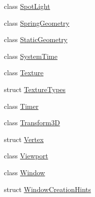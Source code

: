 \begin{DoxyCompactItemize}
\item 
class \mbox{\hyperlink{classec_1_1_spot_light}{Spot\+Light}}
\item 
class \mbox{\hyperlink{classec_1_1_spring_geometry}{Spring\+Geometry}}
\item 
class \mbox{\hyperlink{classec_1_1_static_geometry}{Static\+Geometry}}
\item 
class \mbox{\hyperlink{classec_1_1_system_time}{System\+Time}}
\item 
class \mbox{\hyperlink{classec_1_1_texture}{Texture}}
\item 
struct \mbox{\hyperlink{structec_1_1_texture_types}{Texture\+Types}}
\item 
class \mbox{\hyperlink{classec_1_1_timer}{Timer}}
\item 
class \mbox{\hyperlink{classec_1_1_transform3_d}{Transform3D}}
\item 
struct \mbox{\hyperlink{structec_1_1_vertex}{Vertex}}
\item 
class \mbox{\hyperlink{classec_1_1_viewport}{Viewport}}
\item 
class \mbox{\hyperlink{classec_1_1_window}{Window}}
\item 
struct \mbox{\hyperlink{structec_1_1_window_creation_hints}{Window\+Creation\+Hints}}
\end{DoxyCompactItemize}
